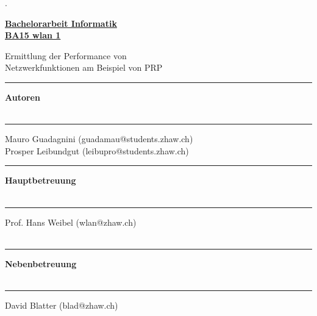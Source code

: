 \AddToShipoutPicture{\BackgroundPic}

\begin{titlepage}


\begin{minipage}[b]{0.095\textwidth}
\hskip 0.05cm
\end{minipage}
\begin{minipage}[b]{0.91\textwidth}
\begin{tiny}.\end{tiny}\vskip 2.8cm
	{\huge
	
	\textbf{\underline{Bachelorarbeit Informatik}}\\
	\textbf{\underline{BA15 wlan 1}}
	
	Ermittlung der Performance von\\
	Netzwerkfunktionen am Beispiel von PRP	
	\vskip 0.5cm}
	
	\begin{minipage}[b]{0.27\textwidth}
	\hrule\vskip 0.5cm
		\textbf{Autoren}\\
		\\
	\end{minipage}
	\begin{minipage}[b]{0.03\textwidth}
	\hskip 0.5cm
	\end{minipage}
	\begin{minipage}[b]{0.7\textwidth}
	\hrule\vskip 0.5cm
		Mauro Guadagnini (guadamau@students.zhaw.ch)\\
		Prosper Leibundgut (leibupro@students.zhaw.ch)\\
	\end{minipage}
	
	\begin{minipage}[b]{0.27\textwidth}
	\hrule\vskip 0.5cm
		\textbf{Hauptbetreuung}\\
		\\
	\end{minipage}
	\begin{minipage}[b]{0.03\textwidth}
	\hskip 0.5cm
	\end{minipage}
	\begin{minipage}[b]{0.7\textwidth}
	\hrule\vskip 0.5cm
		Prof. Hans Weibel (wlan@zhaw.ch)\\
        \\
	\end{minipage}
	
	\begin{minipage}[b]{0.27\textwidth}
	\hrule\vskip 0.5cm
		\textbf{Nebenbetreuung}\\
		\\
	\end{minipage}
	\begin{minipage}[b]{0.03\textwidth}
	\hskip 0.5cm
	\end{minipage}
	\begin{minipage}[b]{0.7\textwidth}
	\hrule\vskip 0.5cm
		David Blatter (blad@zhaw.ch)\\
		\\
	\end{minipage}
	

\end{minipage}
\end{titlepage}
